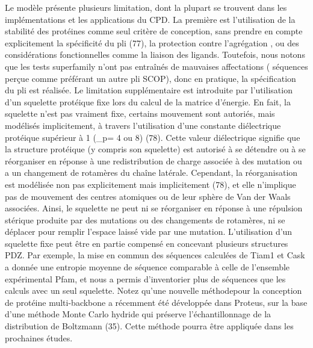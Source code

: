 \begin{enumarete}
\begin{enumerate}
Le modèle présente plusieurs limitation, dont la plupart se trouvent dans les implémentations et les applications du CPD. La première est l'utilisation de la stabilité des protéines comme seul critère de conception, sans prendre en compte explicitement la spécificité du pli (77), la protection contre l'agrégation , ou des considérations fonctionnelles comme la liaison des ligands. Toutefois, nous notons que les tests superfamily n'ont pas entraînés de mauvaises affectations ( séquences perçue comme préférant un autre pli SCOP), donc en pratique, la spécification du pli est réalisée. Le limitation supplémentaire est introduite  par l'utilisation d'un squelette protéique fixe lors du calcul de la matrice d'énergie. En fait, la squelette n'est pas vraiment fixe, certains mouvement sont autoriés, mais modélisés implicitement, à travers l'utilisation d'une constante diélectrique protéique supérieur à 1 (\epsilon_p= 4 ou 8) (78). Cette valeur diélectrique signifie que la structure protéique (y compris son squelette) est autorisé à se détendre ou à se réorganiser en réponse à une redistribution de charge associée à des mutation ou a un changement de rotamères du chaîne latérale. Cependant, la réorganisation est modélisée non pas explicitement mais implicitement (78), et elle n'implique pas de mouvement des centres atomiques ou de leur sphère de Van der Waals associées. Ainsi, le squelette ne peut ni se réorganiser en réponse à une répulsion stérique produite par des mutations ou des changements de rotamères, ni se déplacer pour remplir l'espace laissé vide par une mutation.  
L'utilisation d'un squelette fixe peut être en partie compensé en concevant plusieurs structures PDZ. Par exemple, la mise en commun des séquences calculées de Tiam1 et Cask a donnée une entropie moyenne de séquence comparable à celle de l'ensemble expérimental  Pfam, et nous a permis d'inventorier plus de séquences que les calculs avec un seul squelette. Notez qu'une nouvelle méthodepour la conception de protéine multi-backbone a récemment été développée dans Proteus, sur la base d'une méthode Monte Carlo hydride qui préserve l'échantillonnage de la distribution de Boltzmann (35). Cette méthode pourra être appliquée dans les prochaines études.

\end{enumerate}
\end{enumarete}
